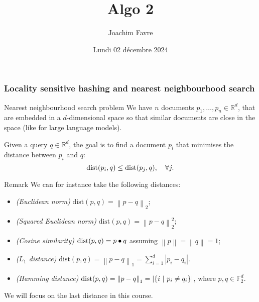 \documentclass[a4paper]{article}
\title{Algo 2}
\author{Joachim Favre}
\date{Lundi 02 décembre 2024}
\begin{document}
\maketitle


\subsubsection{Locality sensitive hashing and nearest neighbourhood search}

\begin{parag}{Nearest neighbourhood search problem}
    We have $n$ documents $p_1, \ldots, p_n \in \mathbb{R}^d$, that are embedded in a $d$-dimensional space so that similar documents are close in the space (like for large language models). 

    Given a query $q \in \mathbb{R}^d$, the goal is to find a document $p_i$ that minimises the distance between $p_i$ and $q$: 
    \[\text{dist}\left(p_i, q\right) \leq \text{dist}\left(p_j, q\right), \mathspace \forall j.\]
    
    \begin{subparag}{Remark}
        We can for instance take the following distances:
        \begin{itemize}
            \item \textit{(Euclidean norm)} $\text{dist}\left(p, q\right) = \left\|p - q\right\|_2$;
            \item \textit{(Squared Euclidean norm)} $\text{dist}\left(p, q\right) = \left\|p - q\right\|_2^2$;
            \item \textit{(Cosine similarity)} $\text{dist}\left(p, q\right) = p\dotprod q$ assuming $\left\|p\right\| = \left\|q\right\| = 1$;
            \item \textit{($L_1$ distance)} $\displaystyle \text{dist}\left(p, q\right) = \left\|p - q\right\|_1 = \sum_{i=1}^{d} \left|p_i - q_i\right|.$
            \item \textit{(Hamming distance)} $\displaystyle \text{dist}\left(p, q\right) = \left\|p - q\right\|_1 = \left|\left\{i \suchthat p_i \neq q_i\right\}\right|$, where $p, q \in \mathbb{F}_2^d$.
        \end{itemize}
        
        We will focus on the last distance in this course.
    \end{subparag}
\end{parag}
\end{document}
